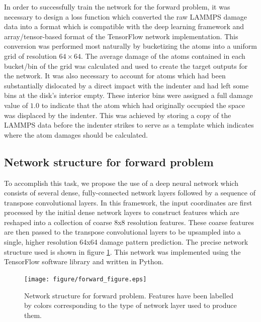 In order to successfully train the network for the forward problem, it was necessary to design a loss function which converted the raw LAMMPS damage data into a format which is compatible with the deep learning framework and array/tensor-based format of the TensorFlow network implementation.  This conversion was performed most naturally by bucketizing the atoms into a uniform grid of resolution $64 \times 64$.  The average damage of the atoms contained in each bucket/bin of the grid was calculated and used to create the target outputs for the network.  It was also necessary to account for atoms which had been substantially dislocated by a direct impact with the indenter and had left some bins at the disk’s interior empty.  These interior bins were assigned a full damage value of $1.0$ to indicate that the atom which had originally occupied the space was displaced by the indenter.  This was achieved by storing a copy of the LAMMPS data before the indenter strikes to serve as a template which indicates where the atom damages should be calculated.


\subsection{Network structure for forward problem}
\label{forward_network}

To accomplish this task, we propose the use of a deep neural network which consists of several dense, fully-connected network layers followed by a sequence of transpose convolutional layers.  In this framework, the input coordinates are first processed by the initial dense network layers to construct features which are reshaped into a collection of coarse 8x8 resolution features.  These coarse features are then passed to the transpose convolutional layers to be upsampled into a single, higher resolution 64x64 damage pattern prediction.  The precise network structure used is shown in figure \ref{fig:forward}.  This network was implemented using the TensorFlow software library and written in Python.

\begin{figure}
  \centering
  \texttt{[image: figure/forward\_figure.eps]}
\caption{Network structure for forward problem.  Features have been labelled by colors corresponding to the type of network layer used to produce them.}
\label{fig:forward}       
\end{figure}

